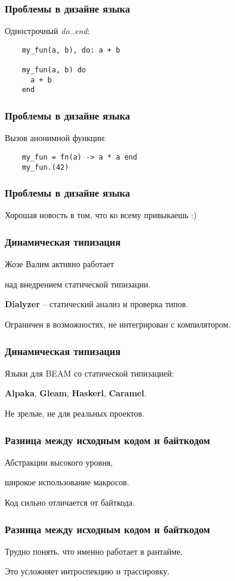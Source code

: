 \documentclass[10pt]{beamer}
\begin{document}
\begin{frame}[fragile]
  \frametitle{Проблемы в дизайне языка}
  Однострочный \textit{do..end}:
  \begin{lstlisting}
    my_fun(a, b), do: a + b

    my_fun(a, b) do
      a + b
    end
  \end{lstlisting}
\end{frame}

\begin{frame}[fragile]
  \frametitle{Проблемы в дизайне языка}
  Вызов анонимной функции:
  \begin{lstlisting}
    my_fun = fn(a) -> a * a end
    my_fun.(42)
  \end{lstlisting}
\end{frame}

\begin{frame}
  \frametitle{Проблемы в дизайне языка}
  Хорошая новость в том, что ко всему привыкаешь :)
\end{frame}

\begin{frame}
  \frametitle{Динамическая типизация}
  Жозе Валим активно работает
  \par
  над внедрением статической типизации.
  \par \bigskip
  \textbf{Dialyzer} -- статический анализ и проверка типов.
  \par
  Ограничен в возможностях, не интегрирован с компилятором.
\end{frame}

\begin{frame}
  \frametitle{Динамическая типизация}
  Языки для BEAM со статической типизацией:
  \par \bigskip
  \textbf{Alpaka}, \textbf{Gleam}, \textbf{Haskerl}, \textbf{Caramel}.
  \par \bigskip
  Не зрелые, не для реальных проектов.
\end{frame}

\begin{frame}
  \frametitle{Разница между исходным кодом и байткодом}
  Абстракции высокого уровня,
  \par \bigskip
  широкое использование макросов.
  \par \bigskip
  Код сильно отличается от байткода.
\end{frame}

\begin{frame}
  \frametitle{Разница между исходным кодом и байткодом}
  Трудно понять, что именно работает в рантайме.
  \par \bigskip
  Это усложняет интроспекцию и трассировку.
\end{frame}
\end{document}
